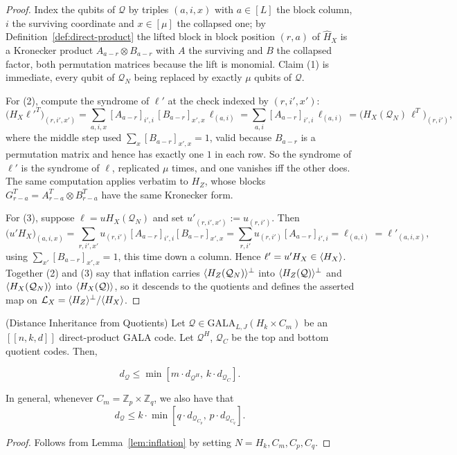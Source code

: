 \begin{proof}
Index the qubits of $\mathcal Q$ by triples $(a,i,x)$ with $a\in[L]$ the block column, $i$ the surviving coordinate and $x\in[\mu]$ the collapsed one; by Definition~\ref{def:direct-product} the lifted block in block position $(r,a)$ of $\hat H_X$ is a Kronecker product $A_{a-r}\otimes B_{a-r}$ with $A$ the surviving and $B$ the collapsed factor, both permutation matrices because the lift is monomial. Claim (1) is immediate, every qubit of $\mathcal Q_N$ being replaced by exactly $\mu$ qubits of $\mathcal Q$.

For (2), compute the syndrome of $\ell'$ at the check indexed by $(r,i',x')$:
\[
    \big(H_X\ell'^T\big)_{(r,i',x')}
    = \sum_{a,i,x}[A_{a-r}]_{i',i}\,[B_{a-r}]_{x',x}\,\ell_{(a,i)}
    = \sum_{a,i}[A_{a-r}]_{i',i}\,\ell_{(a,i)}
    = \big(H_X(\mathcal Q_N)\,\ell^T\big)_{(r,i')} ,
\]
where the middle step used $\sum_x [B_{a-r}]_{x',x} = 1$, valid because $B_{a-r}$ is a permutation matrix and hence has exactly one $1$ in each row. So the syndrome of $\ell'$ is the syndrome of $\ell$, replicated $\mu$ times, and one vanishes iff the other does. The same computation applies verbatim to $H_Z$, whose blocks $G^T_{r-a} = A^T_{r-a}\otimes B^T_{r-a}$ have the same Kronecker form.

For (3), suppose $\ell = uH_X(\mathcal Q_N)$ and set $u'_{(r,i',x')} := u_{(r,i')}$. Then
\[
    \big(u'H_X\big)_{(a,i,x)} = \sum_{r,i',x'}u_{(r,i')}[A_{a-r}]_{i',i}[B_{a-r}]_{x',x}
    = \sum_{r,i'}u_{(r,i')}[A_{a-r}]_{i',i} = \ell_{(a,i)} = \ell'_{(a,i,x)},
\]
using $\sum_{x'}[B_{a-r}]_{x',x} = 1$, this time down a column. Hence $\ell' = u'H_X\in\langle H_X \rangle$. Together (2) and (3) say that inflation carries $\langle H_Z(\mathcal Q_N) \rangle^\perp$ into $\langle H_Z(\mathcal Q) \rangle^\perp$ and $\langle H_X(\mathcal Q_N) \rangle$ into $\langle H_X(\mathcal Q) \rangle$, so it descends to the quotients and defines the asserted map on $\mathcal L_X = \langle H_Z \rangle^\perp/\langle H_X \rangle$.
\end{proof}


\begin{corollary}(Distance Inheritance from Quotients)\label{cor:quotient-distance}
Let $\mathcal{Q}\in \mathrm{GALA}_{L,J}(H_k\times C_m)$ be an $[[n,k,d]]$ direct-product GALA code. Let $\mathcal{Q}^H$, $\mathcal{Q}_C$ be the top and bottom quotient codes. Then,

\begin{equation}
    d_\mathcal{Q}\leq \min[m\cdot d_{\mathcal{Q}^H},\, k\cdot d_{\mathcal{Q}_C}].
\end{equation}

In general, whenever $C_m =  \mathbb  Z_p\times \mathbb Z_q$, we also have that
\begin{equation}
    d_\mathcal{Q}\leq k\cdot\min[ q\cdot  d_{\mathcal{Q}_{C_p}}, \, p\cdot d_{\mathcal{Q}_{C_q}}].
\end{equation}
\end{corollary}
\begin{proof}
    Follows from  Lemma~\ref{lem:inflation} by setting $N = H_k, C_m, C_p, C_q$.
\end{proof}

